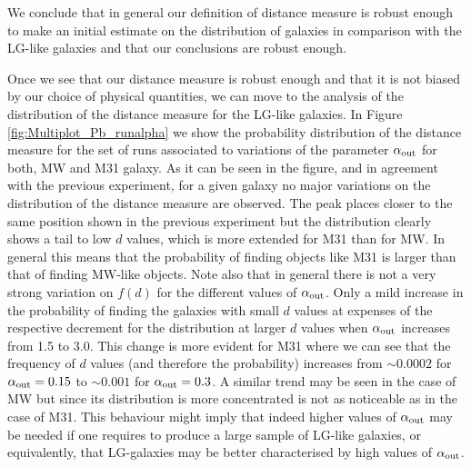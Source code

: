 \documentclass[useAMS,usenatbib]{mn2e}
\begin{document}
We conclude that in general our definition of distance measure is
robust enough to make an initial estimate on the distribution of
galaxies in comparison with the LG-like galaxies and that our
conclusions are robust enough.

Once we see that our distance measure is robust enough and that it is
not biased by our choice of physical quantities, we can move to the
analysis of the distribution of the distance measure for the LG-like
galaxies. In Figure \ref{fig:Multiplot_Pb_runalpha} we show the
probability distribution of the distance measure for the set of runs
associated to variations of the parameter $\alpha_{\rm out}$ for both,
MW and M31 galaxy. As it can be seen in the figure, and in agreement
with the previous experiment, for a given galaxy no major variations
on the distribution of the distance measure are observed. The peak
places closer to the same position shown in the previous experiment
but the distribution clearly shows a tail to low $d$ values, which is
more extended for M31 than for MW. In general this means that the
probability of finding objects like M31 is larger than that of finding
MW-like objects. Note also that in general there is not a very strong
variation on $f(d)$ for the different values of $\alpha_{\rm
  out}$. Only a mild increase in the probability of finding the
galaxies with small $d$ values at expenses of the respective decrement
for the distribution at larger $d$ values when $\alpha_{\rm out}$
increases from 1.5 to 3.0. This change is more evident for M31 where
we can see that the frequency of $d$ values (and therefore the
probability) increases from $\sim0.0002$ for $\alpha_{\rm out} = 0.15$
to $\sim0.001$ for $\alpha_{\rm out} = 0.3$. A similar trend may be
seen in the case of MW but since its distribution is more concentrated
is not as noticeable as in the case of M31. This behaviour might imply
that indeed higher values of $\alpha_{\rm out}$ may be needed if one
requires to produce a large sample of LG-like galaxies, or
equivalently, that LG-galaxies may be better characterised by high
values of $\alpha_{\rm out}$.
\end{document}
